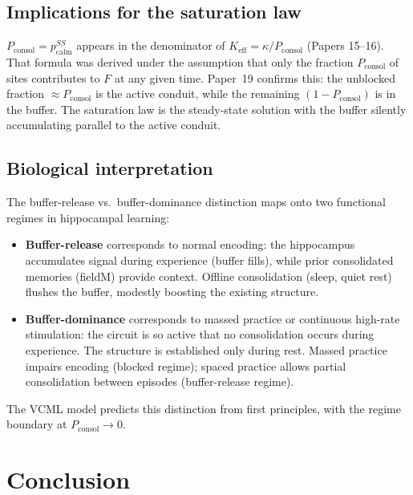 \documentclass[11pt]{article}
\begin{document}
\subsection{Implications for the saturation law}

$P_{\mathrm{consol}} = p_{\mathrm{calm}}^{SS}$ appears in the denominator of
$K_{\mathrm{eff}} = \kappa / P_{\mathrm{consol}}$ (Papers 15--16).
That formula was derived under the assumption that only the fraction $P_{\mathrm{consol}}$
of sites contributes to $F$ at any given time.
Paper~19 confirms this: the unblocked fraction $\approx P_{\mathrm{consol}}$ is
the active conduit, while the remaining $(1 - P_{\mathrm{consol}})$ is in the buffer.
The saturation law is the steady-state solution with the buffer silently accumulating
parallel to the active conduit.

\subsection{Biological interpretation}

The buffer-release vs.\ buffer-dominance distinction maps onto two functional
regimes in hippocampal learning:
\begin{itemize}
  \item \textbf{Buffer-release} corresponds to normal encoding:
    the hippocampus accumulates signal during experience (buffer fills),
    while prior consolidated memories (fieldM) provide context.
    Offline consolidation (sleep, quiet rest) flushes the buffer,
    modestly boosting the existing structure.
  \item \textbf{Buffer-dominance} corresponds to massed practice
    or continuous high-rate stimulation:
    the circuit is so active that no consolidation occurs during experience.
    The structure is established only during rest.
    Massed practice impairs encoding (blocked regime);
    spaced practice allows partial consolidation between episodes (buffer-release regime).
\end{itemize}
The VCML model predicts this distinction from first principles,
with the regime boundary at $P_{\mathrm{consol}} \to 0$.

\section{Conclusion}
\end{document}
